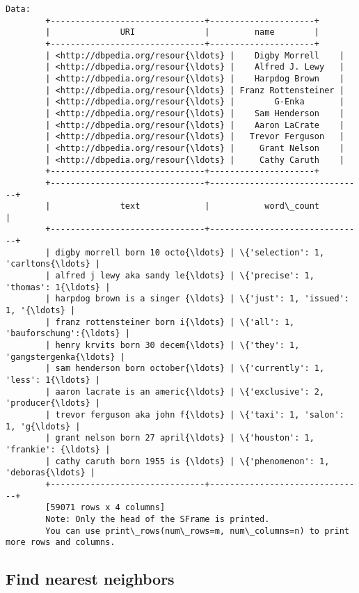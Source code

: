 \documentclass[11pt]{article}
\begin{document}
\begin{Verbatim}[commandchars=\\\{\}]
        Data:
        +-------------------------------+---------------------+
        |              URI              |         name        |
        +-------------------------------+---------------------+
        | <http://dbpedia.org/resour{\ldots} |    Digby Morrell    |
        | <http://dbpedia.org/resour{\ldots} |    Alfred J. Lewy   |
        | <http://dbpedia.org/resour{\ldots} |    Harpdog Brown    |
        | <http://dbpedia.org/resour{\ldots} | Franz Rottensteiner |
        | <http://dbpedia.org/resour{\ldots} |        G-Enka       |
        | <http://dbpedia.org/resour{\ldots} |    Sam Henderson    |
        | <http://dbpedia.org/resour{\ldots} |    Aaron LaCrate    |
        | <http://dbpedia.org/resour{\ldots} |   Trevor Ferguson   |
        | <http://dbpedia.org/resour{\ldots} |     Grant Nelson    |
        | <http://dbpedia.org/resour{\ldots} |     Cathy Caruth    |
        +-------------------------------+---------------------+
        +-------------------------------+-------------------------------+
        |              text             |           word\_count          |
        +-------------------------------+-------------------------------+
        | digby morrell born 10 octo{\ldots} | \{'selection': 1, 'carltons{\ldots} |
        | alfred j lewy aka sandy le{\ldots} | \{'precise': 1, 'thomas': 1{\ldots} |
        | harpdog brown is a singer {\ldots} | \{'just': 1, 'issued': 1, '{\ldots} |
        | franz rottensteiner born i{\ldots} | \{'all': 1, 'bauforschung':{\ldots} |
        | henry krvits born 30 decem{\ldots} | \{'they': 1, 'gangstergenka{\ldots} |
        | sam henderson born october{\ldots} | \{'currently': 1, 'less': 1{\ldots} |
        | aaron lacrate is an americ{\ldots} | \{'exclusive': 2, 'producer{\ldots} |
        | trevor ferguson aka john f{\ldots} | \{'taxi': 1, 'salon': 1, 'g{\ldots} |
        | grant nelson born 27 april{\ldots} | \{'houston': 1, 'frankie': {\ldots} |
        | cathy caruth born 1955 is {\ldots} | \{'phenomenon': 1, 'deboras{\ldots} |
        +-------------------------------+-------------------------------+
        [59071 rows x 4 columns]
        Note: Only the head of the SFrame is printed.
        You can use print\_rows(num\_rows=m, num\_columns=n) to print more rows and columns.
\end{Verbatim}
            
    \subsection{Find nearest neighbors}\label{find-nearest-neighbors}
\end{document}
